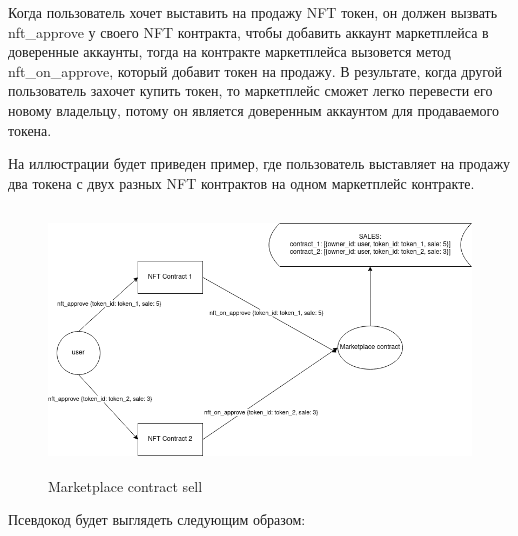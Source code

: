 Когда пользователь хочет выставить на продажу NFT токен, он должен вызвать nft\_approve у своего NFT контракта, чтобы добавить аккаунт маркетплейса в доверенные аккаунты, тогда на контракте маркетплейса вызовется метод nft\_on\_approve, который добавит токен на продажу.
В результате, когда другой пользователь захочет купить токен, то маркетплейс сможет легко перевести его новому владельцу, потому он является доверенным аккаунтом для продаваемого токена.

На иллюстрации будет приведен пример, где пользователь выставляет на продажу два токена с двух разных NFT контрактов на одном маркетплейс контракте.

\begin{figure}[H]
	\centering
	\includegraphics[height=70mm]{fig/sell.png}
	\caption{Marketplace contract sell}
\end{figure}

Псевдокод будет выглядеть следующим образом:

